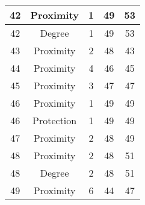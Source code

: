 \documentclass[results.tex]{subfiles}
\begin{document}
\begin{center}
\begin{tabular}{| c || c | c | c | c |}
    \hline
    42 & Proximity & 1 & 49 & 53 \\ 
    \hline
    42 & Degree & 1 & 49 & 53 \\ 
    \hline
    43 & Proximity & 2 & 48 & 43 \\ 
    \hline
    44 & Proximity & 4 & 46 & 45 \\ 
    \hline
    45 & Proximity & 3 & 47 & 47 \\ 
    \hline
    46 & Proximity & 1 & 49 & 49 \\ 
    \hline
    46 & Protection & 1 & 49 & 49 \\ 
    \hline
    47 & Proximity & 2 & 48 & 49 \\ 
    \hline
    48 & Proximity & 2 & 48 & 51 \\ 
    \hline
    48 & Degree & 2 & 48 & 51 \\ 
    \hline
    49 & Proximity & 6 & 44 & 47 \\ 
    \hline   \end{tabular}
\end{center}
\end{document}
